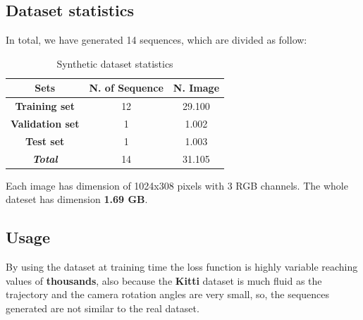 \subsection{Dataset statistics}\label{subsec:dataset-statistics}
In total, we have generated 14 sequences, which are divided as follow:
\begin{table}[H]
    \center
    \begin{tabular}{|c|c|c|}
        \hline
        \textbf{Sets}           & \textbf{N. of Sequence} & \textbf{N. Image} \\ \hline
        \textbf{Training set}   & 12                      & 29.100            \\ \hline
        \textbf{Validation set} & 1                       & 1.002             \\ \hline
        \textbf{Test set}       & 1                       & 1.003             \\ \hline
        \textit{\textbf{Total}} & 14                      & 31.105            \\ \hline
    \end{tabular}\caption{Synthetic dataset statistics}
    \label{tab:synthetic-dataset-statistics}
\end{table}
Each image has dimension of 1024x308 pixels with 3 RGB channels.
The whole dateset has dimension \textbf{1.69 GB}.
\subsection{Usage}\label{subsec:usage}
By using the dataset at training time the loss function is highly variable reaching values of \textbf{thousands}, also because the \textbf{Kitti} dataset is much fluid as the trajectory and the camera rotation angles are very small, so, the sequences generated are not similar to the real dataset.